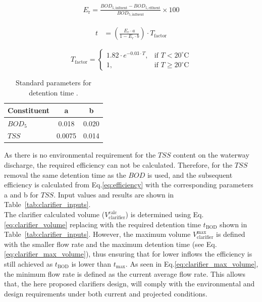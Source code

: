 \documentclass[11pt]{article}
\begin{document}
\begin{align}
  E_{\text{r}} = \frac{BOD_{5,\text{influent}} - BOD_{5,\text{effluent}}}{BOD_{5,\text{influent}}} \times 100
  \label{eq:efficiency}
\end{align}

\begin{align}
t &= \left( \frac{E_r \cdot a}{1 - E_r \cdot b} \right) \cdot T_{\text{factor}}
\label{eq:time_of_residency}
\end{align}

\begin{equation}
T_{\text{factor}} =
\begin{cases}
1.82 \cdot e^{-0.03 \cdot T}, & \text{if } T < 20^\circ\text{C} \\
1, & \text{if } T \geq 20^\circ\text{C}
\end{cases}
\label{eq:temperature_factor}
\end{equation}

\begin{table}[h]
  \centering
  \caption{Standard parameters for detention time \cite{metcalf_2014_wastewater}.}
  \label{tab:detention_time_parameters}
  \begin{tabular}{|l|c|c|}
    \hline
    \textbf{Constituent} & \textbf{a} & \textbf{b}\\
    \hline
    $BOD_5$ & 0.018 & 0.020\\
    $TSS$ & 0.0075 & 0.014\\
    \hline
  \end{tabular}
\end{table}

As there is no environmental requirement for the $TSS$ content on the waterway discharge, the required 
efficiency can not be calculated. Therefore, for the $TSS$ removal the same detention time as the $BOD$ is used, and the subsequent
efficiency is calculated from Eq.\eqref{eq:efficiency} 
with the corresponding parameters a and b for $TSS$. Input values and results are 
shown in Table~{\ref{tab:clarifier_inputs}}.\\


The clarifier calculated volume ($V_{\text{clarifier}}^{\text{calc}}$) is determined using Eq.\eqref{eq:clarifier_volume} 
replacing with the required detention time
$t_{\text{BOD}}$ shown in Table~\ref{tab:clarifier_inputs}. However, the maximum volume 
$V_{\text{clarifier}}^{\text{max}}$ is defined with the smaller flow rate and the maximum 
detention time (see Eq.\eqref{eq:clarifier_max_volume}), thus ensuring that for lower 
inflows the efficiency is still achieved as $t_{\text{BOD}}$ is lower than $t_{\text{max}}$.
As seen in Eq.\eqref{eq:clarifier_max_volume}, the minimum flow rate is defined as the current average
flow rate. This allows that, the here proposed clarifiers design, will comply with 
the environmental and design requirements under both current and projected conditions.\\
\end{document}
